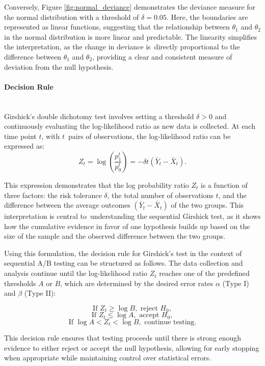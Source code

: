 \documentclass[magisterska, english]{pwr_wmat_praca_dyplomowa}
\theoremstyle{plain}
\numberwithin{theorem}{chapter}
\theoremstyle{definition}
\numberwithin{theorem}{chapter}
\newcommand{\myparagraph}[1]{\paragraph{#1}\mbox{}\\}
\begin{document}
Conversely, Figure \ref{fig:normal_deviance} demonstrates the deviance measure for the normal distribution with a threshold of \(\delta = 0.05\). Here, the boundaries are represented as linear functions, suggesting that the relationship between \(\theta_1\) and \(\theta_2\) in the normal distribution is more linear and predictable. The linearity simplifies the interpretation, as the change in deviance is~directly proportional to the difference between \(\theta_1\) and \(\theta_2\), providing a clear and consistent measure of deviation from the null hypothesis.


\myparagraph{Decision Rule}

Girshick’s double dichotomy test involves setting a threshold \(\delta > 0\) and continuously evaluating the log-likelihood ratio as new data is collected. At each time point \(t\), with \(t\)~pairs of observations, the log-likelihood ratio can be expressed as:
\[
Z_t = \log \left(\frac{p_1^t}{p_0^t}\right) = -\delta  t
 (\bar{Y}_t - \bar{X}_t).
\]

This expression demonstrates that the log probability ratio \(Z_t\) is a function of three factors: the risk tolerance \(\delta\), the total number of observations \(t\), and the difference between the average outcomes \((\bar{Y}_t - \bar{X}_t)\) of the two groups. This interpretation is central to~understanding the sequential Girshick test, as it shows how the cumulative evidence in favor of one hypothesis builds up based on the size of the sample and the observed difference between the two groups.

Using this formulation, the decision rule for Girshick’s test in the context of sequential A/B testing can be structured as follows. The data collection and analysis continue until the log-likelihood ratio \(Z_t\) reaches one of the predefined thresholds \(A\) or \(B\), which are determined by the desired error rates \(\alpha\) (Type I) and \(\beta\) (Type II):

\[
\text{If } Z_t \geq \log B, \text{ reject } H_0,
\]
\[
\text{If } Z_t \leq \log A, \text{ accept } H_0,
\]
\[
\text{If } \log A < Z_t < \log B, \text{ continue testing}.
\]

This decision rule ensures that testing proceeds until there is strong enough evidence to either reject or accept the null hypothesis, allowing for early stopping when appropriate while maintaining control over statistical errors.
\end{document}
